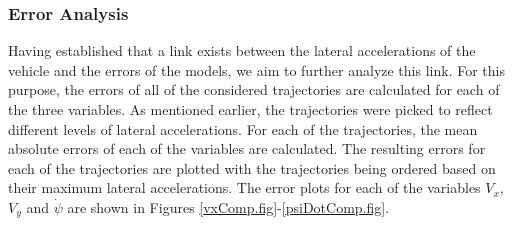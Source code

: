 \documentclass[journal]{IEEEtran}
\begin{document}



\subsubsection{Error Analysis}
Having  established that a link exists between the lateral accelerations of the vehicle and the errors of the models, we aim to further analyze this link. For this purpose, the errors of all of the considered trajectories are calculated for each of the three variables. As mentioned earlier, the trajectories were picked to reflect different levels of lateral accelerations. For each of the trajectories, the mean absolute errors of each of the variables are calculated. The resulting errors for each of the trajectories are plotted with the trajectories being ordered based on their maximum lateral accelerations. The error plots for each of the variables $V_x$, $V_y$ and $\dot\psi$ are shown in Figures \ref{vxComp.fig}-\ref{psiDotComp.fig}.
\end{document}
